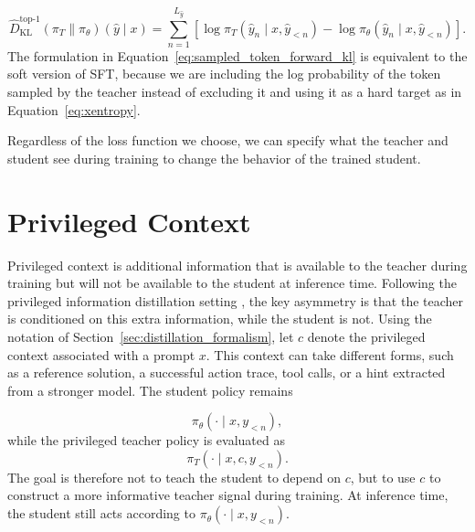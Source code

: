 \begin{equation}
\widehat{D}_{\mathrm{KL}}^{\mathrm{top}\mbox{-}1}
(\pi_T \| \pi_\theta)(\hat{y} \mid x)
= \sum_{n=1}^{L_{\hat{y}}}
\left[
\log \pi_T(\hat{y}_n \mid x, \hat{y}_{<n})
- \log \pi_\theta(\hat{y}_n \mid x, \hat{y}_{<n})
\right].
\label{eq:sampled_token_forward_kl}
\end{equation}
%
The formulation in Equation~\ref{eq:sampled_token_forward_kl} is equivalent to the soft version of SFT, because we are including the log probability of the token sampled by the teacher instead of excluding it and using it as a hard target as in Equation~\ref{eq:xentropy}.

Regardless of the loss function we choose, we can specify what the teacher and student see during training to change the behavior of the trained student.

\section{Privileged Context} \label{sec: methods_pc}

Privileged context is additional information that is available to the teacher during training but will not be available to the student at inference time. Following the privileged information distillation setting  \citep{shenfeldSelfDistillationEnablesContinual2026, hubotterReinforcementLearningSelfDistillation2026, penalozaPrivilegedInformationDistillation2026, zhaoSelfDistilledReasonerOnPolicy2026}, the key asymmetry is that the teacher is conditioned on this extra information, while the student is not. Using the notation of Section~\ref{sec:distillation_formalism}, let $c$ denote the privileged context associated with a prompt $x$. This context can take different forms, such as a reference solution, a successful action trace, tool calls, or a hint extracted from a stronger model. The student policy remains

\begin{equation}
\pi_\theta(\cdot \mid x, y_{<n}),
\end{equation}
%
while the privileged teacher policy is evaluated as
%
\begin{equation}
\pi_T(\cdot \mid x, c, y_{<n}).
\end{equation}
%
The goal is therefore not to teach the student to depend on $c$, but to use $c$ to construct a more informative teacher signal during training. At inference time, the student still acts according to $\pi_\theta(\cdot \mid x, y_{<n})$.

